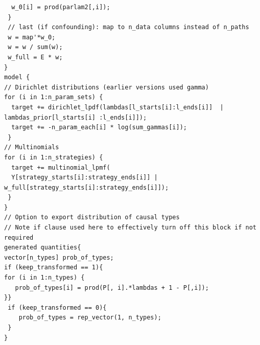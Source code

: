 \documentclass[
  article]{jss}
\begin{document}
\begin{verbatim}
  w_0[i] = prod(parlam2[,i]);
 }
 // last (if confounding): map to n_data columns instead of n_paths
 w = map'*w_0;
 w = w / sum(w);
 w_full = E * w;
}
model {
// Dirichlet distributions (earlier versions used gamma)
for (i in 1:n_param_sets) {
  target += dirichlet_lpdf(lambdas[l_starts[i]:l_ends[i]]  | lambdas_prior[l_starts[i] :l_ends[i]]);
  target += -n_param_each[i] * log(sum_gammas[i]);
 }
// Multinomials
for (i in 1:n_strategies) {
  target += multinomial_lpmf(
  Y[strategy_starts[i]:strategy_ends[i]] | w_full[strategy_starts[i]:strategy_ends[i]]);
 }
}
// Option to export distribution of causal types
// Note if clause used here to effectively turn off this block if not required
generated quantities{
vector[n_types] prob_of_types;
if (keep_transformed == 1){
for (i in 1:n_types) {
   prob_of_types[i] = prod(P[, i].*lambdas + 1 - P[,i]);
}}
 if (keep_transformed == 0){
    prob_of_types = rep_vector(1, n_types);
 }
}
\end{verbatim}


  
\end{document}
